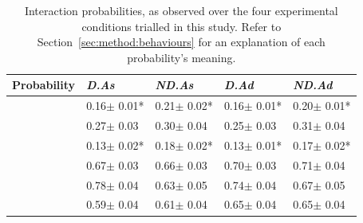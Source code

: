 \begin{table}[t!]
    \caption{Interaction probabilities, as observed over the four experimental conditions trialled in this study. Refer to Section~\ref{sec:method:behaviours} for an explanation of each probability's meaning.}
    \label{tbl_probabilities}
    \renewcommand{\arraystretch}{1.4}
    \begin{center}
    \begin{small}
    \begin{tabulary}{\textwidth}{L{3.2cm}||D{1.6cm}|D{1.6cm}|D{1.6cm}|D{1.6cm}}
   
   \hline
    
    \textbf{Probability} & \textbf{\emph{D.As}} & \textbf{\emph{ND.As}} & \textbf{\emph{D.Ad}} & \textbf{\emph{ND.Ad}} \\ \hline\hline
     & 0.16$\pm$ 0.01* & 0.21$\pm$ 0.02* & 0.16$\pm$ 0.01* & 0.20$\pm$ 0.01* \\ \hline
     & 0.27$\pm$ 0.03 & 0.30$\pm$ 0.04 & 0.25$\pm$ 0.03 & 0.31$\pm$ 0.04 \\ \hline
     & 0.13$\pm$ 0.02* & 0.18$\pm$ 0.02* & 0.13$\pm$ 0.01* & 0.17$\pm$ 0.02* \\ \hline\hline
     & 0.67$\pm$ 0.03 & 0.66$\pm$ 0.03 & 0.70$\pm$ 0.03 & 0.71$\pm$ 0.04 \\ \hline
     & 0.78$\pm$ 0.04 & 0.63$\pm$ 0.05 & 0.74$\pm$ 0.04 & 0.67$\pm$ 0.05 \\ \hline
     & 0.59$\pm$ 0.04 & 0.61$\pm$ 0.04 & 0.65$\pm$ 0.04 & 0.65$\pm$ 0.04 \\ \hline
    \end{tabulary}
    \end{small}
    \end{center}
\end{table}


